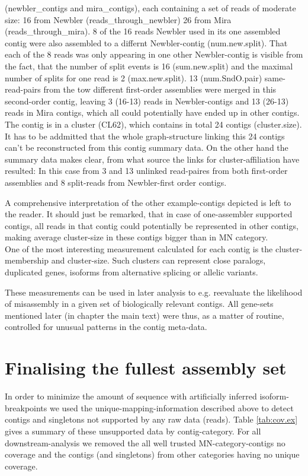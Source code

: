 \documentclass[12pt,a4paper]{article}
\begin{document}
(newbler\_contigs and mira\_contigs), each containing a set of reads
of moderate size: 16 from Newbler (reads\_through\_newbler) 26 from
Mira (reads\_through\_mira). 8 of the 16 reads Newbler used in its one
assembled contig were also assembled to a differnt Newbler-contig
(num.new.split). That each of the 8 reads was only appearing in one
other Newbler-contig is visible from the fact, that the number of
split events is 16 (sum.new.split) and the maximal number of splits
for one read is 2 (max.new.split). 13 (num.SndO.pair) same-read-pairs
from the tow different first-order assemblies were merged in this
second-order contig, leaving 3 (16-13) reads in Newbler-contigs and 13
(26-13) reads in Mira contigs, which all could potentially have ended
up in other contigs. The contig is in a cluster (CL62), which contains
in total 24 contigs (cluster.size). It has to be addmitted that the
whole graph-structure linking this 24 contigs can't be reconstructed
from this contig summary data. On the other hand the summary data
makes clear, from what source the links for cluster-affiliation have
resulted: In this case from 3 and 13 unlinked read-paires from both
first-order assemblies and 8 split-reads from Newbler-first order
contigs.

A comprehensive interpretation of the other example-contigs depicted
is left to the reader. It should just be remarked, that in case of
one-assembler supported contigs, all reads in that contig could
potentially be represented in other contigs, making average
cluster-size in these contigs bigger than in MN category.\\

One of the most interesting measurement calculated for each contig is
the cluster-membership and cluster-size. Such clusters can represent
close paralogs, duplicated genes, isoforms from alternative splicing
or allelic variants.

These measurements can be used in later analysis to e.g. reevaluate
the likelihood of misassembly in a given set of biologically relevant
contigs. All gene-sets mentioned later (in chapter the main text) were
thus, as a matter of routine, controlled for unusual patterns in the
contig meta-data.

\section{Finalising the fullest assembly set}
\label{sec:final-full-assembly}

In order to minimize the amount of sequence with artificially inferred
isoform-breakpoints we used the unique-mapping-information described
above to detect contigs and singletons not supported by any raw data
(reads). Table \ref{tab:cov.ex} gives a summary of these unsupported
data by contig-category. For all downstream-analysis we removed the
all well trusted MN-category-contigs no coverage and the contigs (and
singletons) from other categories having no unique coverage.
\end{document}
